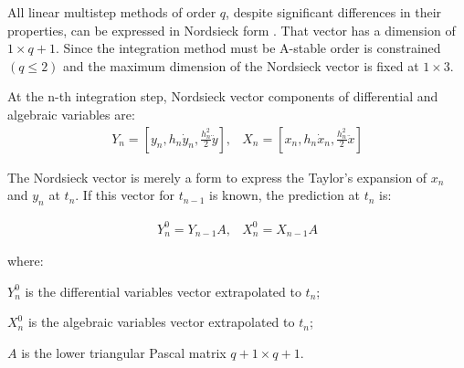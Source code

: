 \documentclass[lettersize,journal]{IEEEtran}
\begin{document}
All linear multistep methods of order \(q\), despite significant differences in their properties, can be expressed in Nordsieck form \cite{hairer93}. That vector has a dimension of \(1 \times q+1\). Since the integration method must be A-stable order is constrained \((q \leq 2)\) and the maximum dimension of the Nordsieck vector is fixed at \(1 \times 3\). 

At the n-th integration step, Nordsieck vector components of differential and algebraic variables are:
\begin{equation}
	\label{eqn_nords}
	\begin{array}{cc}
		Y_n=\left[y_n, h_n \dot{y}_n, \frac{h_n^2}{2} \ddot{y}\right], &
		X_n=\left[x_n, h_n \dot{x}_n, \frac{h_n^2}{2} \ddot{x}\right] 
	\end{array}
\end{equation}

The Nordsieck vector is merely a form to express the Taylor's expansion of \(x_n\) and \(y_n\) at \(t_n\). If this vector for \(t_{n-1}\) is known, the prediction at \(t_n\) is:

\begin{equation}
	\label{eqn_predictor}
	\begin{array}{cc}
		Y_n^0=Y_{n-1}A, &
		X_n^0=X_{n-1}A
	\end{array}
\end{equation}

\noindent where:
\begin{description}
	\item  \(Y_n^0\) is the differential variables vector extrapolated to \(t_n\);
	\item  \(X_n^0\) is the algebraic variables vector extrapolated to \(t_n\);
	\item  \(A\) is the lower triangular Pascal matrix \(q+1 \times q+1\).
\end{description}
\end{document}
